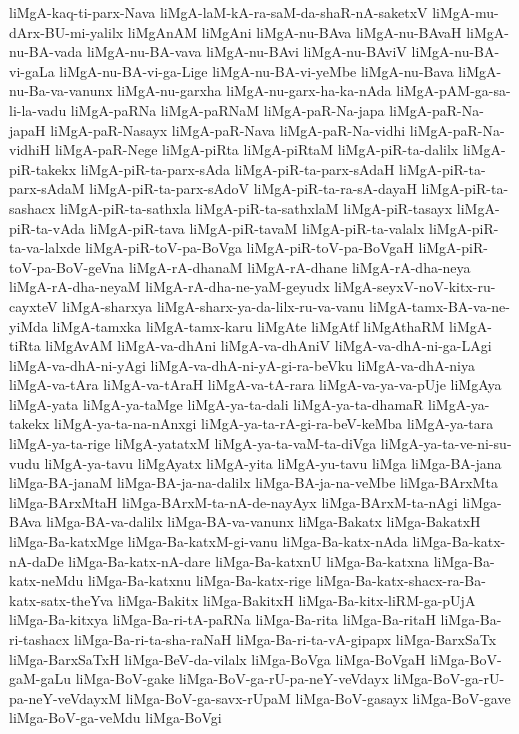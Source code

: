 {liMgA-kaq-ti-parx-Nava
liMgA-laM-kA-ra-saM-da-shaR-nA-saketxV
liMgA-mu-dArx-BU-mi-yalilx
liMgAnAM
liMgAni
liMgA-nu-BAva
liMgA-nu-BAvaH
liMgA-nu-BA-vada
liMgA-nu-BA-vava
liMgA-nu-BAvi
liMgA-nu-BAviV
liMgA-nu-BA-vi-gaLa
liMgA-nu-BA-vi-ga-Lige
liMgA-nu-BA-vi-yeMbe
liMgA-nu-Bava
liMgA-nu-Ba-va-vanunx
liMgA-nu-garxha
liMgA-nu-garx-ha-ka-nAda
liMgA-pAM-ga-sa-li-la-vadu
liMgA-paRNa
liMgA-paRNaM
liMgA-paR-Na-japa
liMgA-paR-Na-japaH
liMgA-paR-Nasayx
liMgA-paR-Nava
liMgA-paR-Na-vidhi
liMgA-paR-Na-vidhiH
liMgA-paR-Nege
liMgA-piRta
liMgA-piRtaM
liMgA-piR-ta-dalilx
liMgA-piR-takekx
liMgA-piR-ta-parx-sAda
liMgA-piR-ta-parx-sAdaH
liMgA-piR-ta-parx-sAdaM
liMgA-piR-ta-parx-sAdoV
liMgA-piR-ta-ra-sA-dayaH
liMgA-piR-ta-sashacx
liMgA-piR-ta-sathxla
liMgA-piR-ta-sathxlaM
liMgA-piR-tasayx
liMgA-piR-ta-vAda
liMgA-piR-tava
liMgA-piR-tavaM
liMgA-piR-ta-valalx
liMgA-piR-ta-va-lalxde
liMgA-piR-toV-pa-BoVga
liMgA-piR-toV-pa-BoVgaH
liMgA-piR-toV-pa-BoV-geVna
liMgA-rA-dhanaM
liMgA-rA-dhane
liMgA-rA-dha-neya
liMgA-rA-dha-neyaM
liMgA-rA-dha-ne-yaM-geyudx
liMgA-seyxV-noV-kitx-ru-cayxteV
liMgA-sharxya
liMgA-sharx-ya-da-lilx-ru-va-vanu
liMgA-tamx-BA-va-ne-yiMda
liMgA-tamxka
liMgA-tamx-karu
liMgAte
liMgAtf
liMgAthaRM
liMgA-tiRta
liMgAvAM
liMgA-va-dhAni
liMgA-va-dhAniV
liMgA-va-dhA-ni-ga-LAgi
liMgA-va-dhA-ni-yAgi
liMgA-va-dhA-ni-yA-gi-ra-beVku
liMgA-va-dhA-niya
liMgA-va-tAra
liMgA-va-tAraH
liMgA-va-tA-rara
liMgA-va-ya-va-pUje
liMgAya
liMgA-yata
liMgA-ya-taMge
liMgA-ya-ta-dali
liMgA-ya-ta-dhamaR
liMgA-ya-takekx
liMgA-ya-ta-na-nAnxgi
liMgA-ya-ta-rA-gi-ra-beV-keMba
liMgA-ya-tara
liMgA-ya-ta-rige
liMgA-yatatxM
liMgA-ya-ta-vaM-ta-diVga
liMgA-ya-ta-ve-ni-su-vudu
liMgA-ya-tavu
liMgAyatx
liMgA-yita
liMgA-yu-tavu
liMga
liMga-BA-jana
liMga-BA-janaM
liMga-BA-ja-na-dalilx
liMga-BA-ja-na-veMbe
liMga-BArxMta
liMga-BArxMtaH
liMga-BArxM-ta-nA-de-nayAyx
liMga-BArxM-ta-nAgi
liMga-BAva
liMga-BA-va-dalilx
liMga-BA-va-vanunx
liMga-Bakatx
liMga-BakatxH
liMga-Ba-katxMge
liMga-Ba-katxM-gi-vanu
liMga-Ba-katx-nAda
liMga-Ba-katx-nA-daDe
liMga-Ba-katx-nA-dare
liMga-Ba-katxnU
liMga-Ba-katxna
liMga-Ba-katx-neMdu
liMga-Ba-katxnu
liMga-Ba-katx-rige
liMga-Ba-katx-shacx-ra-Ba-katx-satx-theYva
liMga-Bakitx
liMga-BakitxH
liMga-Ba-kitx-liRM-ga-pUjA
liMga-Ba-kitxya
liMga-Ba-ri-tA-paRNa
liMga-Ba-rita
liMga-Ba-ritaH
liMga-Ba-ri-tashacx
liMga-Ba-ri-ta-sha-raNaH
liMga-Ba-ri-ta-vA-gipapx
liMga-BarxSaTx
liMga-BarxSaTxH
liMga-BeV-da-vilalx
liMga-BoVga
liMga-BoVgaH
liMga-BoV-gaM-gaLu
liMga-BoV-gake
liMga-BoV-ga-rU-pa-neY-veVdayx
liMga-BoV-ga-rU-pa-neY-veVdayxM
liMga-BoV-ga-savx-rUpaM
liMga-BoV-gasayx
liMga-BoV-gave
liMga-BoV-ga-veMdu
liMga-BoVgi
}
